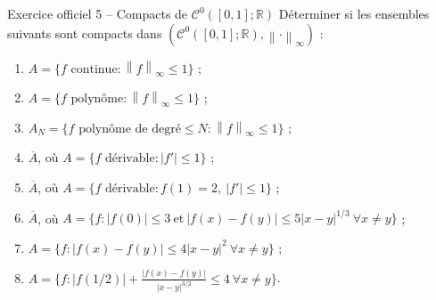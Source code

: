 \documentclass[11pt,a4paper]{article}
\newcommand{\R}{\mathbb{R}}
\newcommand{\adh}[1]{\overline{#1}}
\newcommand{\norm}[1]{\left\|#1\right\|}
\newcommand{\Cz}{\mathcal{C}^0}
\theoremstyle{definition}
\begin{document}
\begin{exo}{Exercice officiel 5 -- Compacts de $\Cz([0,1];\R)$}
Déterminer si les ensembles suivants sont compacts dans $(\Cz([0,1];\R),\norm\cdot_\infty)$ :
\begin{enumerate}[label=(\alph*)]
  \item $A=\{f\text{ continue} : \norm f_\infty\le1\}$ ;
  \item $A=\{f\text{ polynôme} : \norm f_\infty\le1\}$ ;
  \item $A_N=\{f\text{ polynôme de degré}\le N : \norm f_\infty\le1\}$ ;
  \item $\adh A$, où $A=\{f\text{ dérivable} : |f'|\le1\}$ ;
  \item $\adh A$, où $A=\{f\text{ dérivable} : f(1)=2,\ |f'|\le1\}$ ;
  \item $\adh A$, où $A=\{f : |f(0)|\le3\ \text{et}\ |f(x)-f(y)|\le5|x-y|^{1/3}\ \forall x\ne y\}$ ;
  \item $A=\{f : |f(x)-f(y)|\le4|x-y|^2\ \forall x\ne y\}$ ;
  \item $A=\{f : |f(1/2)|+\frac{|f(x)-f(y)|}{|x-y|^{3/2}}\le4\ \forall x\ne y\}$.
\end{enumerate}
\end{exo}
\end{document}
